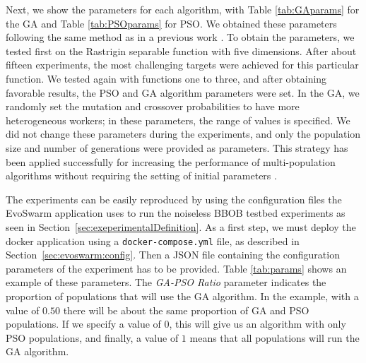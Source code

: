 \documentclass[review]{elsarticle}
\begin{document}
Next, we show the parameters for each algorithm, with Table \ref{tab:GAparams} for
the GA and Table \ref{tab:PSOparams} for PSO. We obtained these parameters
following the same method as in a previous work \cite{garcia2017benchmarking}.
To obtain the parameters, we tested first on the Rastrigin separable function
with five dimensions. After about fifteen experiments, the most challenging
targets were achieved for this particular function. We tested again with
functions one to three, and after obtaining favorable results, the PSO and GA
algorithm parameters were set. In the GA, we randomly set the mutation and
crossover probabilities to have more heterogeneous workers; %
in these parameters, the range of values is specified. We did not change these parameters during the 
experiments, and only the population size and number of generations were
provided as parameters. This strategy has been applied successfully for increasing 
the performance of multi-population algorithms without requiring the setting 
of initial parameters \cite{garcia2014randomized}.

The experiments can be easily reproduced by using the configuration
files the EvoSwarm application uses to run the noiseless BBOB testbed
experiments as seen in Section~\ref{sec:exeperimentalDefinition}. %
As a first step, we must deploy the docker application using a
{\tt docker-compose.yml} file, as described in Section~\ref{sec:evoswarm:config}. 
Then a JSON file containing the configuration parameters of the
experiment has to be provided.  Table \ref{tab:params} shows an example of these
parameters. The {\em GA-PSO Ratio} parameter indicates the proportion of
populations that will use the GA algorithm.  In the example, with a value of
$0.50$ there will be about the same proportion of GA and PSO populations. If we
specify a value of $0$, this will give us an algorithm with only PSO
populations, and finally, a value of  $1$ means that all populations will run
the GA algorithm. %
\end{document}
